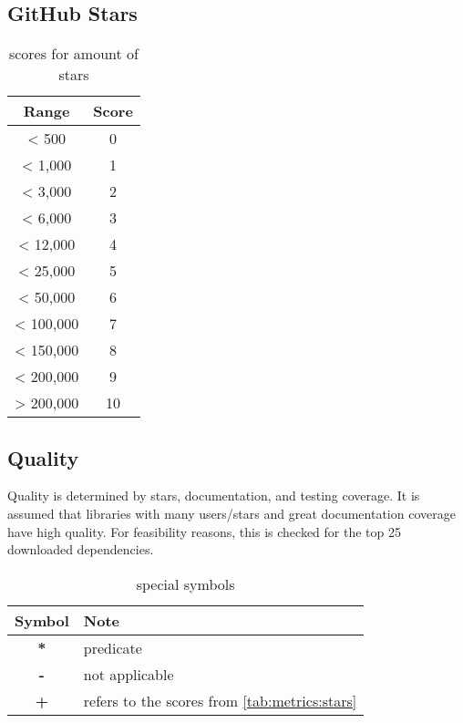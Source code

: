 \subsection{GitHub Stars}
\begin{table}[H]
    \centering
    \begin{tabular}{|c|c|}
        \hline
        \textbf{Range} & \textbf{Score} \\
        \hline
        < 500          & 0              \\ \hline
        < 1,000        & 1              \\ \hline
        < 3,000        & 2              \\ \hline
        < 6,000        & 3              \\ \hline
        < 12,000       & 4              \\ \hline
        < 25,000       & 5              \\ \hline
        < 50,000       & 6              \\ \hline
        < 100,000      & 7              \\ \hline
        < 150,000      & 8              \\ \hline
        < 200,000      & 9              \\ \hline
        > 200,000      & 10             \\ \hline
    \end{tabular}
    \caption{scores for amount of stars}
    \label{tab:metrics:stars}
\end{table}


\subsection{Quality}
\label{app:metrics:ecosystem:quality}

Quality is determined by stars, documentation, and testing coverage. It is assumed that libraries with many users/stars and great documentation coverage have high quality. For feasibility reasons, this is checked for the top 25 downloaded dependencies.

\begin{table}[H]
    \centering
    \begin{tabular}{|c|l|}
        \hline
        \textbf{Symbol} & \textbf{Note}                                         \\
        \hline
        \textbf{*}      & \gls{predicate}                                       \\ \hline
        \textbf{-}      & not applicable                                        \\ \hline
        \textbf{+}      & refers to the scores from \autoref{tab:metrics:stars} \\ \hline
    \end{tabular}
    \caption{special symbols}
    \label{tab:metrics:symbols}
\end{table}

